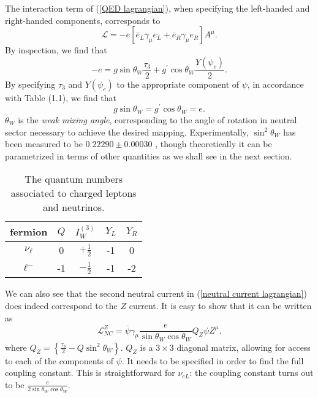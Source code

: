 \documentclass[10pt,a4paper]{book}
\begin{document}
The interaction term of (\ref{QED lagrangian}), when specifying the left-handed and right-handed components, corresponds to
\begin{equation}
\mathcal{L} = -e\left[ \overline{e}_L\gamma_\mu e_L + \overline{e}_R\gamma_\mu e_R
\right]A^\mu.
\end{equation} 
By inspection, we find that
\begin{equation}
-e = g\sin\theta_W \frac{\tau_3}{2} + g^\prime \cos\theta_W \frac{Y(\psi_{e})}{2}.
\end{equation}
By specifying $\tau_3$ and $Y(\psi_e)$ to the appropriate component of $\psi$, in accordance with Table (1.1), we find that
\begin{equation}
g\sin\theta_W = g^\prime \cos\theta_W = e.
\end{equation}
$\theta_W$ is the \emph{weak mixing angle}, corresponding to the angle of rotation in neutral sector necessary to achieve the desired mapping. Experimentally, $\sin^2\theta_W$ has been measured to be $0.22290 \pm 0.00030$ \cite{NIST}, though theoretically it can be parametrized in terms of other quantities as we shall see in the next section.


\begin{table} 
\begin{center}
\begin{tabular}{ccccc}
\hline 
fermion & $Q$ & $I^{(3)}_W$ & $Y_L$ & $Y_R$ \\ 
\hline 
$\nu_\ell$ & 0 & $+\frac{1}{2}$ & -1 & 0 \\ 
$\ell^-$ & -1 & $-\frac{1}{2}$ & -1 & -2 \\ 
\hline
\end{tabular}
\caption{The quantum numbers associated to charged leptons and neutrinos.}
\end{center}
\end{table}

We can also see that the second neutral current in (\ref{neutral current lagrangian}) does indeed correspond to the $Z$ current. It is easy to show that it can be written as
\begin{equation}
\label{NC - Z}
\mathcal{L}_{NC}^{Z} = \overline{\psi}\gamma_\mu \frac{e}{\sin\theta_W \cos\theta_W} Q_Z \psi Z^\mu.
\end{equation}
where $Q_Z = \left\lbrace \frac{\tau_3}{2} - Q\sin^2\theta_W \right\rbrace$. $Q_Z$ is a $3\times 3$ diagonal matrix, allowing for access to each of the components of $\psi$. It needs to be specified in order to find the full coupling constant. This is straightforward for $\nu_{eL}$: the coupling constant turns out to be $\frac{e}{2\sin\theta_W\cos\theta_W}$. 
\end{document}
